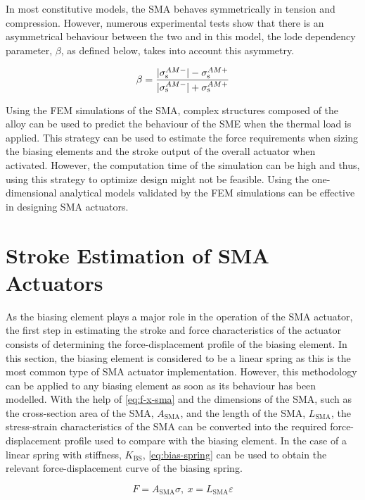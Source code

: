 In most constitutive models, the SMA behaves symmetrically in tension and compression. However, numerous experimental tests show that there is an asymmetrical behaviour between the two and in this model, the lode dependency parameter, $\beta$, as defined below, takes into account this asymmetry.

\begin{equation}
    \label{eq:fem-beta}
    \beta = \frac{|\sigma_\mathrm{s}^{AM-}|-\sigma_\mathrm{s}^{AM+}}{|\sigma_\mathrm{s}^{AM-}|+\sigma_\mathrm{s}^{AM+}}
\end{equation}

Using the FEM simulations of the SMA, complex structures composed of the alloy can be used to predict the behaviour of the SME when the thermal load is applied. This strategy can be used to estimate the force requirements when sizing the biasing elements and the stroke output of the overall actuator when activated. However, the computation time of the simulation can be high and thus, using this strategy to optimize design might not be feasible. Using the one-dimensional analytical models validated by the FEM simulations can be effective in designing SMA actuators.

\section{Stroke Estimation of SMA Actuators}
As the biasing element plays a major role in the operation of the SMA actuator, the first step in estimating the stroke and force characteristics of the actuator consists of determining the force-displacement profile of the biasing element. In this section, the biasing element is considered to be a linear spring as this is the most common type of SMA actuator implementation. However, this methodology can be applied to any biasing element as soon as its behaviour has been modelled. With the help of \cref{eq:f-x-sma} and the dimensions of the SMA, such as the cross-section area of the SMA, $A_\mathrm{SMA}$, and the length of the SMA, $L_\mathrm{SMA}$, the stress-strain characteristics of the SMA can be converted into the required force-displacement profile used to compare with the biasing element. In the case of a linear spring with stiffness, $K_\mathrm{BS}$, \cref{eq:bias-spring} can be used to obtain the relevant force-displacement curve of the biasing spring.

\begin{equation}
    \label{eq:f-x-sma}
    F = A_\mathrm{SMA}\sigma,~x = L_\mathrm{SMA}\varepsilon
\end{equation}

